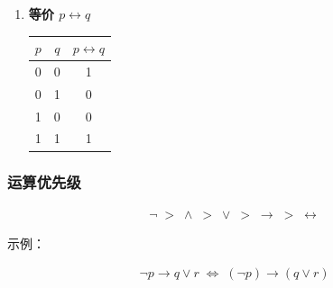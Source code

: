\begin{enumerate}
	
	
	\item \textbf{等价 $p\leftrightarrow q$}
	\begin{center}
		\begin{tabular}{|c|c|c|}
			\hline
			$p$ & $q$ & $p\leftrightarrow q$ \\
			\hline
			0 & 0 & 1 \\
			0 & 1 & 0 \\
			1 & 0 & 0 \\
			1 & 1 & 1 \\
			\hline
		\end{tabular}
	\end{center}
	
	
\end{enumerate}

\subsubsection{运算优先级}
\begin{align*}
	\neg \;>\; \land \;>\; \lor \;>\; \to \;>\; \leftrightarrow
\end{align*}

示例：

\begin{align*}
	\neg p \to q \lor r \;\Leftrightarrow\; (\neg p)\to(q\lor r)
\end{align*}

